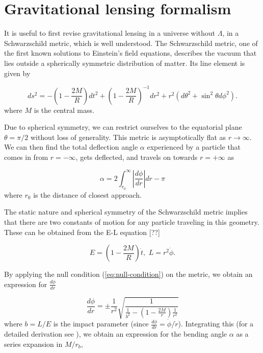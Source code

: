 \chapter{Gravitational lensing formalism}
\label{chapter:gravitational-lensing-formalism}

It is useful to first revise gravitational lensing in a universe without $\Lambda$, in a Schwarzschild metric, which is well understood. The Schwarzschild metric, one of the first known solutions to Einstein's field equations, describes the vacuum that lies outside a spherically symmetric distribution of matter. Its line element is given by

\begin{equation}
  ds^2 = -\left ( 1- \frac{2M}{R} \right ) dt^2 + \left ( 1 - \frac{2M}{R}\right )^{-1} dr^2 + r^2(d\theta^2 + \sin^2\theta d \phi^2).
  \label{eq:schwarzschild-metric}
\end{equation}
where $M$ is the central mass. 

Due to spherical symmetry, we can restrict ourselves to the equatorial plane $\theta = \pi/2$ without loss of generality. This metric is asymptotically flat as $r \rightarrow \infty$. We can then find the total deflection angle $\alpha$ experienced by a particle that comes in from $r=-\infty$, gets deflected, and travels on towards $r=+\infty$ as 

\begin{equation}
  \alpha = 2 \int_{r_0}^{\infty} \left |  \frac{d\phi}{dr} \right | dr - \pi
\end{equation}
where $r_0$ is the distance of closest approach. 

The static nature and spherical symmetry of the Schwarzschild metric implies that there are two constants of motion for any particle traveling in this geometry. These can be obtained from the E-L equation [??]

\begin{equation}
  E = \left ( 1 - \frac{2M}{R} \right ) \dot{t}, \,\, L = r^2\dot{\phi}.
  \label{eq:schwarzschild-constants}
\end{equation}

By applying the null condition (\autoref{eq:null-condition}) on the metric, we obtain an expression for $\frac{d\phi}{dr}$

\begin{equation}
  \frac{d\phi}{dr} = \pm \frac{1}{r^2} \sqrt{\frac{1}{ \frac{1}{b^2} - \left (1- \frac{2M}{r} \right )\frac{1}{r^2} }}
  \label{eq:dphi-dr}
\end{equation}
where $b = L/E$ is the impact parameter (since $\frac{d\phi}{dr} = \dot{\phi}/\dot{r}$). Integrating this (for a detailed derivation see \cite{keeton2005formalism}), we obtain an expression for the bending angle $\alpha$ as a series expansion in $M/r_b$, 

